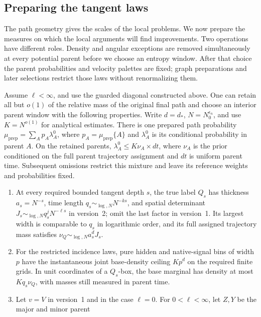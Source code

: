 \subsection{Preparing the tangent laws}

The path geometry gives the scales of the local problems.  We now prepare
the measures on which the local arguments will find improvements.  Two
operations have different roles.  Density and angular exceptions are
removed simultaneously at every potential parent before we choose an
entropy window.  After that choice the parent probabilities and velocity
palettes are fixed; graph preparations and later selections restrict those
laws without renormalizing them.

\begin{proposition}\label{prop:tangent-palette}
Assume \(\ell<\infty\), and use the guarded diagonal constructed above.
One can retain all but \(o(1)\) of the relative mass of the original final
path and choose an interior parent window with the following properties.
Write \(d=d_*\), \(N=N_0^{\epsilon_n}\), and use \(K=N^{o(1)}\) for
analytical estimates.
There is one prepared path probability
\(\mu_{\mathrm{prep}}=\sum_Ap_A\lambda_A^0\), where
\(p_A=\mu_{\mathrm{prep}}\{A\}\) and \(\lambda_A^0\) is its
conditional probability in parent \(A\).  On the retained parents,
\(\lambda_A^0\le K\nu_A\times dt\), where \(\nu_A\) is the prior
conditioned on the full parent trajectory assignment and \(dt\) is
uniform parent time.  Subsequent omissions restrict this mixture and
leave its reference weights and probabilities fixed.
\begin{enumerate}
\item At every required bounded tangent depth \(s\), the true label
\(Q_s\) has thickness \(a_s=N^{-s}\), time length
\(q_s\sim_{\log,N}N^{-ks}\), and spatial determinant
\(J_s\sim_{\log,N}q_s^jN^{-\ell s}\) in version~2; omit the last
factor in version~1.  Its largest width is comparable to \(q_s\) in
logarithmic order, and its full assigned trajectory mass satisfies
\(\nu_Q\sim_{\log,N}a_s^dJ_s\).
\item For the restricted incidence laws, pure hidden and native-signal
bins of width \(p\) have the instantaneous joint base-density ceiling \(Kp^d\) on the required
finite grids.  In unit coordinates of a \(Q_s\)-box, the base marginal
has density at most \(Kq_s\nu_Q\), with masses still measured in
parent time.
\item Let \(v=V\) in version~1 and in the case \(\ell=0\).  For
\(0<\ell<\infty\), let \(Z,Y\) be the major and minor parent

\end{enumerate}
\end{proposition}
